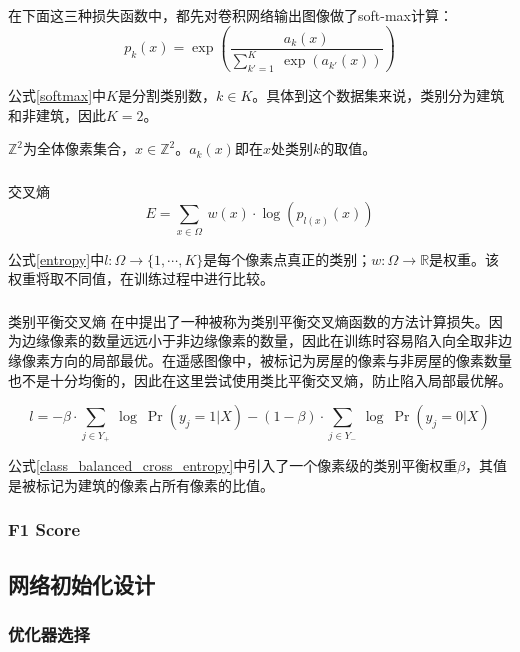 在下面这三种损失函数中，都先对卷积网络输出图像做了soft-max计算：
\begin{equation}\label{softmax}
p_k(x)=\exp(\frac{a_k(x)}{\sum\limits_{k'=1}^K \ \exp(a_{k'}(x))})
\end{equation}

公式\ref{softmax}中$K$是分割类别数，$k\in K$。具体到这个数据集来说，类别分为建筑和非建筑，因此$K=2$。

$\mathbb{Z}^2$为全体像素集合，$x\in \mathbb{Z}^2$。$a_k(x)$即在$x$处类别$k$的取值。
\subsubsection{}{交叉熵}
\begin{equation}\label{entropy}
E=\sum_{x\in \Omega}\ w(x)\cdot \log(p_{l(x)}(x))
\end{equation}

公式\ref{entropy}中$l: \Omega\rightarrow\{1,\cdots,K\}$是每个像素点真正的类别；$w: \Omega\rightarrow\mathbb{R}$是权重。该权重将取不同值，在训练过程中进行比较。
\subsubsection{}{类别平衡交叉熵}
在\cite{xie2015holistically}中提出了一种被称为类别平衡交叉熵函数的方法计算损失。因为边缘像素的数量远远小于非边缘像素的数量，因此在训练时容易陷入向全取非边缘像素方向的局部最优。在遥感图像中，被标记为房屋的像素与非房屋的像素数量也不是十分均衡的，因此在这里尝试使用类比平衡交叉熵，防止陷入局部最优解。

\begin{equation}\label{class_balanced_cross_entropy}
    l=-\beta\cdot \sum\limits_{j\in Y_+}\ \log\ \Pr(y_j=1|X)-(1-\beta)\cdot \sum\limits_{j\in Y_-}\ \log\ \Pr(y_j=0|X)
\end{equation}

公式\ref{class_balanced_cross_entropy}中引入了一个像素级的类别平衡权重$\beta$，其值是被标记为建筑的像素占所有像素的比值。
\subsubsection{F1 Score}
\subsection{网络初始化设计}
\subsubsection{优化器选择}

